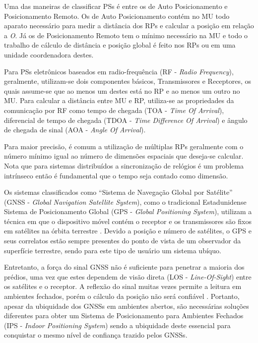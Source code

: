Uma das maneiras de classificar PSs é entre os de Auto Posicionamento e
Posicionamento Remoto. Os de Auto Posicionamento contém no MU todo aparato
necessário para medir a distância dos RPs e calcular a posição em relação a
\textit{O}. Já os de Posicionamento Remoto tem o mínimo necessário na MU e todo
o trabalho de cálculo de distância e posição global é feito nos RPs ou em uma
unidade coordenadora destes.

Para PSs eletrônicos baseados em radio-frequência (RF - \textit{Radio
Frequency}), geralmente, utilizam-se dois componentes básicos, Transmissores e
Receptores, os quais assume-se que ao menos um destes está no RP e ao menos um
outro no MU. Para calcular a distância entre MU e RP, utiliza-se as propriedades
da comunicação por RF como tempo de chegada (TOA - \textit{Time Of Arrival}),
diferencial de tempo de chegada (TDOA - \textit{Time Difference Of Arrival}) e
ângulo de chegada de sinal (AOA - \textit{Angle Of Arrival}).

Para maior precisão, é comum a utilização de múltiplas RPs geralmente com o
número mínimo igual ao número de dimensões espaciais que deseja-se calcular.
Nota que para sistemas distribuídos a sincronização de relógios é um problema
intrínseco então é fundamental que o tempo seja contado como dimensão.

Os sistemas classificados como ``Sistema de Navegação Global por Satélite''
(GNSS - \textit{Global Navigation Satellite System}), como o tradicional
Estadunidense Sistema de Posicionamento Global (GPS - \textit{Global Positioning
System}), utilizam a técnica em que o dispositivo móvel contém o receptor e os
transmissores são fixos em satélites na órbita terrestre \cite{Djuknic2001}.
Devido a posição e número de satélites, o GPS e seus correlatos estão sempre
presentes do ponto de vista de um observador da superfície terrestre, sendo para
este tipo de usuário um sistema ubíquo.

Entretanto, a força do sinal GNSS não é suficiente para penetrar a maioria dos
prédios, uma vez que estes dependem de visão direta (LOS -
\textit{Line-Of-Sight}) entre os satélites e o receptor. A reflexão do sinal
muitas vezes permite a leitura em ambientes fechados, porém o cálculo da posição
não será confiável \cite{Chen2000}. Portanto, apesar da ubiquidade dos
GNSSs em ambientes abertos, são necessárias soluções diferentes para obter um
Sistema de Posicionamento para Ambientes Fechados (IPS - \textit{Indoor
Positioning System}) sendo a ubiquidade deste essencial para conquistar o mesmo
nível de confiança trazido pelos GNSSs.

